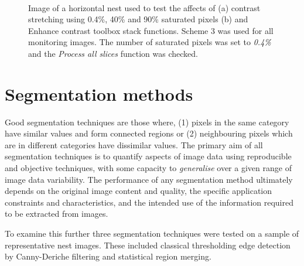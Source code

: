 \begin{figure}[!htbp]\myfloatalign
{} \
\caption[Fiji contrast enhancement.]{Image of a horizontal nest used to test the affects of (a) contrast stretching using 0.4\%, 40\% and 90\% saturated pixels (b) and Enhance contrast toolbox stack functions. Scheme 3 was used for all monitoring images. The number of saturated pixels was set to \emph{0.4\%} and the \emph{Process all slices} function was checked.}\label{fig:fiji-menu}
\end{figure}

\section{Segmentation methods}
Good segmentation techniques are those where, (1) pixels in the same category have similar values and form connected regions or (2) neighbouring pixels which are in different categories have dissimilar values.  The primary aim of all segmentation techniques is to quantify aspects of image data using reproducible and objective techniques, with some capacity to \emph{generalise} over a given range of image data variability. The performance of any segmentation method ultimately depends on the original image content and quality, the specific application constraints and characteristics, and the intended use of the information required to be extracted from images. 

To examine this further three segmentation techniques were tested on a sample of representative nest images. These included classical thresholding edge detection by Canny-Deriche filtering and statistical region merging.


